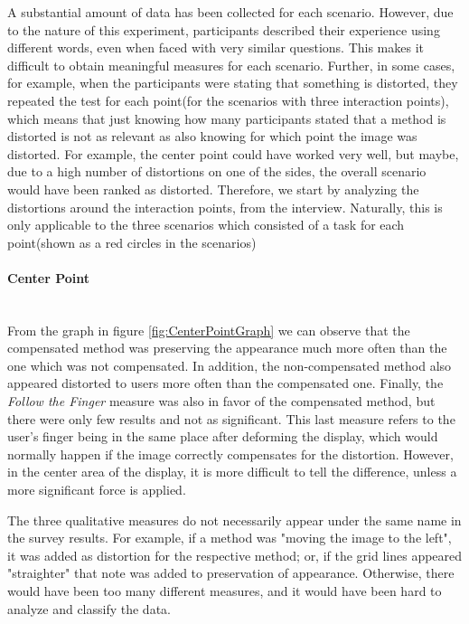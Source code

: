 \documentclass[]{article}
\begin{document}
A substantial amount of data has been collected for each scenario. However, due to the nature of this experiment, participants described their experience using different words, even when faced with very similar questions. This makes it difficult to obtain meaningful measures for each scenario. Further, in some cases, for example, when the participants were stating that something is distorted, they repeated the test for each point(for the scenarios with three interaction points), which means that just knowing how many participants stated that a method is distorted is not as relevant as also knowing for which point the image was distorted. For example, the center point could have worked very well, but maybe, due to a high number of distortions on one of the sides, the overall scenario would have been ranked as distorted. Therefore, we start by analyzing the distortions around the interaction points, from the interview. Naturally, this is only applicable to the three scenarios which consisted of a task for each point(shown as a red circles in the scenarios)
\\
\paragraph{Center Point}\mbox{}\\

From the graph in figure \ref{fig:CenterPointGraph} we can observe that the compensated method was preserving the appearance much  more often than the one which was not compensated. In addition, the non-compensated method also appeared distorted to users more often than the compensated one. Finally, the \textit{Follow the Finger} measure was also in favor of the compensated method, but there were only few results and not as significant. This last measure refers to the user's finger being in the same place after deforming the display, which would normally happen if the image correctly compensates for the distortion. However, in the center area of the display, it is more difficult to tell the difference, unless a more significant force is applied.

The three qualitative measures do not necessarily appear under the same name in the survey results. For example, if a method was "moving the image to the left", it was added as distortion for the respective method; or, if the grid lines appeared "straighter" that note was added to preservation of appearance. Otherwise, there would have been too many different measures, and it would have been hard to analyze and classify the data.
\end{document}
